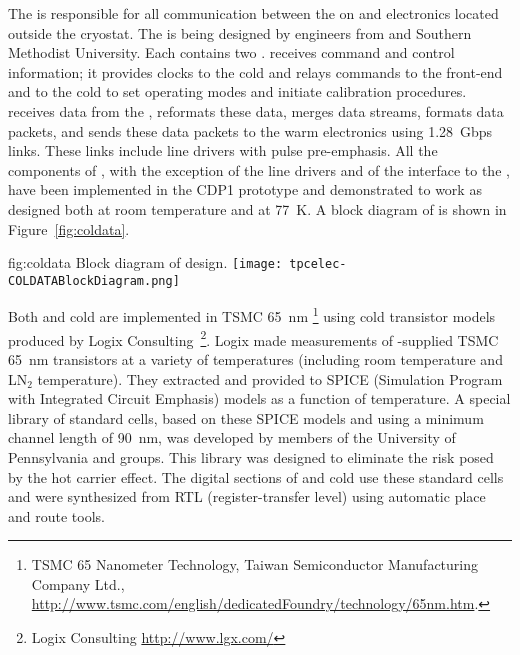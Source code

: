 The   is responsible for all communication between the %
 on  and electronics located outside the cryostat.  The   is being designed by engineers from \fnal and Southern Methodist University.  Each  contains two  .   receives command and control information; it provides clocks to the cold   and relays commands to the  front-end and to the cold   to set operating modes and initiate calibration procedures.   receives data from the  , reformats these data, merges data streams, formats data packets, and sends these data packets to the warm electronics using \SI{1.28}{Gbps} links.  These links include line drivers with pulse pre-emphasis.  All the components of , with the exception of the line drivers and of the interface to the , have been implemented in the CDP1 prototype  and demonstrated to work as designed both at room temperature and at \SI{77}{K}.  A block diagram of  is shown in Figure~\ref{fig:coldata}.  

\begin{dunefigure}
{fig:coldata}
{Block diagram of   design.}
\texttt{[image: tpcelec-COLDATABlockDiagram.png]}
\end{dunefigure}

Both  and cold  are implemented in TSMC \SI{65}{nm} \footnote{TSMC 65 Nanometer Technology\texttrademark{}, Taiwan Semiconductor Manufacturing Company Ltd., \url{http://www.tsmc.com/english/dedicatedFoundry/technology/65nm.htm}.} 
using cold transistor models produced by Logix Consulting~\footnote{Logix Consulting\texttrademark{} \url{http://www.lgx.com/}}.  Logix made measurements of \fnal-supplied TSMC \SI{65}{nm} transistors at a variety of temperatures (including room temperature and LN$_2$ temperature).  They extracted and provided to \fnal SPICE (Simulation Program with Integrated Circuit Emphasis) models as a function of temperature.  A special library of standard cells, based on these SPICE models and using a minimum channel length of \SI{90}{nm}, was developed by members of the University of Pennsylvania and \fnal groups.  This library was designed to eliminate the risk posed by the hot carrier effect.  The digital sections of  and cold  use these standard cells and were synthesized from RTL (register-transfer level) using automatic place and route tools.
